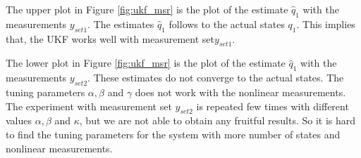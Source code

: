 The upper plot in Figure \ref{fig:ukf_msr} is the plot of the estimate $\hat q_1$ with the measurements $y_{set1}$. The estimates $\hat q_1$ follows to the actual states $q_1$. This implies that, the UKF works well with measurement set$y_{set1}$.

The lower plot in Figure \ref{fig:ukf_msr} is the plot of the estimate $\hat q_1$ with the measurements $y_{set2}$.  These estimates do not converge to the actual states. The tuning parameters $\alpha,\beta$ and $\gamma$ does not work with the nonlinear measurements. The experiment with measurement set $y_{set2}$ is repeated few times with different values $\alpha, \beta$ and $\kappa$, but we are not able to obtain any fruitful results. So it is hard to find the tuning parameters for the system with more number of states and nonlinear measurements.

